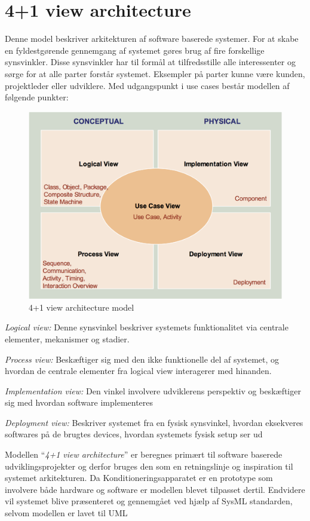 \section{4+1 view architecture} \label{title:viewArc}
Denne model beskriver arkitekturen af software baserede systemer. For at skabe en fyldestgørende gennemgang af systemet gøres brug af fire forskellige synsvinkler. Disse synsvinkler har til formål at  tilfredsstille alle interessenter og sørge for at alle parter forstår systemet. Eksempler på parter kunne være kunden, projektleder eller udviklere. Med udgangspunkt i use cases består modellen af følgende punkter: 

\begin{figure}[H]
	\includegraphics[width=\textwidth]{filer/4plus1model.png}
	\caption{4+1 view architecture model}\label{fig:4plus1model}
\end{figure}

\textit{Logical view:} Denne synsvinkel beskriver systemets funktionalitet via centrale elementer, mekanismer og stadier.

\textit{Process view:} Beskæftiger sig med den ikke funktionelle del af systemet, og hvordan de centrale elementer fra logical view interagerer med hinanden.

\textit{Implementation view:} Den vinkel involvere udviklerens perspektiv og beskæftiger sig med hvordan software implementeres

\textit{Deployment view:} Beskriver systemet fra en fysisk synsvinkel, hvordan eksekveres softwares på de brugtes devices, hvordan systemets fysisk setup ser ud 

Modellen “\textit{4+1 view architecture}” er beregnes primært til software baserede udviklingsprojekter og derfor bruges den som en retningslinje og inspiration til systemet arkitekturen. Da Konditioneringsapparatet er en prototype som involvere både hardware og software er modellen blevet tilpasset dertil. Endvidere vil systemet blive præsenteret og gennemgået ved hjælp af SysML standarden, selvom modellen er lavet til UML

